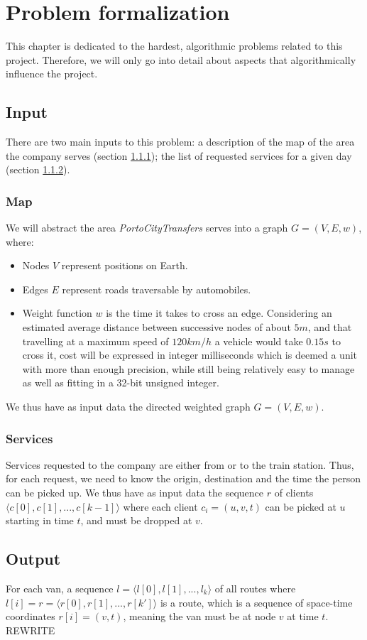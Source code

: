 \documentclass{report}[a4paper]
\theoremstyle{remark}
\begin{document}
\chapter{Problem formalization}
This chapter is dedicated to the hardest, algorithmic problems related to this project. Therefore, we will only go into detail about aspects that algorithmically influence the project.
\section{Input}
There are two main inputs to this problem: a description of the map of the area the company serves (section \ref{input-map}); the list of requested services for a given day (section \ref{input-services}).
\subsection{Map} \label{input-map}
We will abstract the area \emph{PortoCityTransfers} serves into a graph $G=(V,E, w)$, where:
\begin{itemize}
    \item Nodes $V$ represent positions on Earth.
    \item Edges $E$ represent roads traversable by automobiles.
    \item Weight function $w$ is the time it takes to cross an edge. Considering an estimated average distance between successive nodes of about $5 m$, and that travelling at a maximum speed of $120 km/h$ a vehicle would take $0.15 s$ to cross it, cost will be expressed in integer milliseconds which is deemed a unit with more than enough precision, while still being relatively easy to manage as well as fitting in a 32-bit unsigned integer.
\end{itemize}
We thus have as input data the directed weighted graph $G=(V,E,w)$.
\subsection{Services} \label{input-services}
Services requested to the company are either from or to the train station. Thus, for each request, we need to know the origin, destination and the time the person can be picked up.
We thus have as input data the sequence $r$ of clients $\langle c[0], c[1], ..., c[k-1] \rangle$ where each client $c_i=(u, v, t)$ can be picked at $u$ starting in time $t$, and must be dropped at $v$.
\section{Output}
For each van, a sequence $l=\langle l[0], l[1], ..., l_k \rangle$ of all routes where $l[i]=r=\langle r[0], r[1],..., r[k']\rangle$ is a route, which is a sequence of space-time coordinates $r[i]=(v, t)$, meaning the van must be at node $v$ at time $t$. REWRITE
\end{document}
